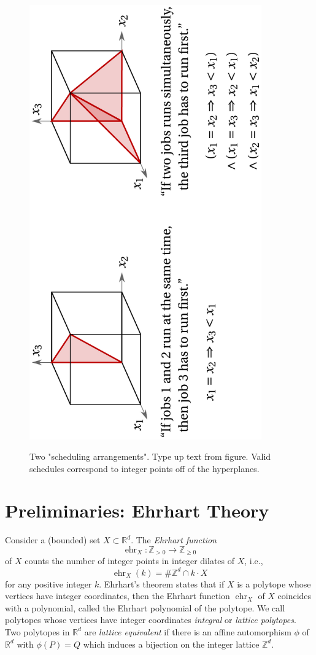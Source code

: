 \documentclass[12pt,reqno]{amsart}
\numberwithin{definition}{section}
\theoremstyle{definition}
\newcommand{\rar}{\rightarrow}
\newcommand{\RR}{\mathbb{R}}
\newcommand{\ZZ}{\mathbb{Z}}
\newcommand{\ehr}{\operatorname{ehr}}
\begin{document}
\begin{figure}[h]
\includegraphics[width=10cm]{schedule}
\label{fig:intro}
\caption{Two "scheduling arrangements".  Type up text from figure.
  Valid schedules correspond to integer points off of the
  hyperplanes. }
\end{figure}



\section{Preliminaries: Ehrhart Theory}
\label{Ehrhart}

Consider a (bounded) set $X\subset \RR^d$. The \emph{Ehrhart function} 
\[
  \ehr_X:\ZZ_{> 0}\rar\ZZ_{\geq 0}
\]
of $X$ counts the number of integer points in integer dilates of $X$, i.e., 
\[
  \ehr_X(k) = \#\ZZ^d \cap k\cdot X
\]
for any positive integer $k$. Ehrhart's theorem states that if $X$ is a polytope whose vertices have integer coordinates, then the Ehrhart function $\ehr_X$ of $X$ coincides with a polynomial, called the Ehrhart polynomial of the polytope. We call polytopes whose vertices have integer coordinates \emph{integral} or \emph{lattice polytopes}. Two polytopes in $\RR^d$ are \emph{lattice equivalent} if there is an affine automorphism $\phi$ of $\RR^d$ with $\phi(P)=Q$ which induces a bijection on the integer lattice $\ZZ^d$.
\end{document}
